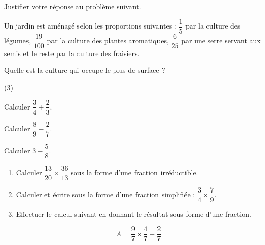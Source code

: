 \documentclass[a4paper,11pt,fleqn]{article}
\begin{document}
\begin{EXO}{}{}
Justifier votre réponse au problème suivant.


 Un jardin est aménagé selon les proportions suivantes :  $\dfrac{1}{5}$ par la culture des légumes, $\dfrac{19}{100}$ par  la culture des plantes aromatiques, $\dfrac{6}{25}$ par  une serre servant aux semis et le reste par la culture des fraisiers. 

 Quelle est la culture qui occupe le plus de surface ?


\end{EXO}

\begin{EXO}{}{}


\begin{tasks}(3)
	\task \begin{minipage}[t]{\linewidth} Calculer $\dfrac{3}{4} + \dfrac{2}{3}$. \end{minipage}
	\task \begin{minipage}[t]{\linewidth} Calculer $\dfrac{8}{9} - \dfrac{2}{7}$. \end{minipage}
    \task Calculer $3 - \dfrac{5}{8}$.
\end{tasks}
\end{EXO}

\begin{EXO}{}{}
\begin{enumerate}

\item Calculer  $\dfrac{13}{20}\times \dfrac{36}{13}$ sous la forme d'une fraction irréductible. 



\item Calculer et écrire sous la forme d'une fraction simplifiée : $\dfrac{3}{4}\times \dfrac{7}{9}$.



\item Effectuer le calcul suivant en donnant le résultat sous forme d'une fraction.

 $$A = \dfrac{9}{7} \times \dfrac{4}{7} - \dfrac{2}{7}$$
\end{enumerate}
\end{EXO}
\end{document}
